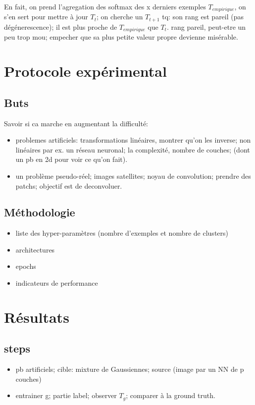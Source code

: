 En fait, on prend l'agregation des softmax des x derniers exemples $T_{empirique}$, on s'en sert pour mettre à jour $T_t$; on cherche un $T_{t+1}$ tq: son rang est pareil (pas dégénerescence); il est plus proche de $T_{empirique}$ que $T_t$.
rang pareil, peut-etre un peu trop mou; empecher que sa plus petite valeur propre devienne misérable.

\chapter{Protocole expérimental}
\section{Buts}
Savoir si ca marche en augmentant la difficulté:
\begin{itemize}
\item problemes artificiels: transformations linéaires, montrer qu'on les inverse; non linéaires par ex. un réseau neuronal; la complexité, nombre de couches; (dont un pb en 2d pour voir ce qu'on fait).
\item un problème pseudo-réel; images satellites; noyau de convolution; prendre des patchs; objectif est de deconvoluer. 
\end{itemize}

\section{Méthodologie}
\begin{itemize}
\item liste des hyper-paramètres (nombre d'exemples et nombre de clusters)
\item architectures
\item epochs
\item indicateurs de performance
\end{itemize}

\chapter{Résultats}
\section{steps}
\begin{itemize}
\item pb artificiels; cible: mixture de Gaussiennes; source (image par un NN de p couches)
\item entrainer g; partie label; observer $T_g$; comparer à la ground truth.
\end{itemize}


